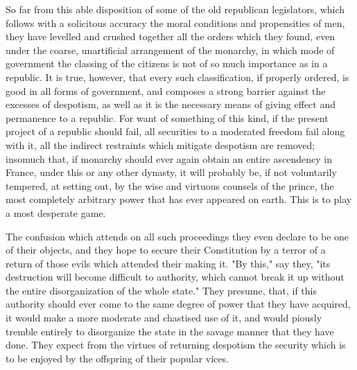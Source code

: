 So far from this able disposition of some of the old republican legislators, which follows with a solicitous accuracy the moral conditions and propensities of men, they have levelled and crushed together all the orders which they found, even under the coarse, unartificial arrangement of the monarchy, in which mode of government the classing of the citizens is not of so much importance as in a republic. It is true, however, that every such classification, if properly ordered, is good in all forms of government, and composes a strong barrier against the excesses of despotism, as well as it is the necessary means of giving effect and permanence to a republic. For want of something of this kind, if the present project of a republic should fail, all securities to a moderated freedom fail along with it, all the indirect restraints which mitigate despotism are removed; insomuch that, if monarchy should ever again obtain an entire ascendency in France, under this or any other dynasty, it will probably be, if not voluntarily tempered, at setting out, by the wise and virtuous counsels of the prince, the most completely arbitrary power that has ever appeared on earth. This is to play a most desperate game.

The confusion which attends on all such proceedings they even declare to be one of their objects, and they hope to secure their Constitution by a terror of a return of those evils which attended their making it. "By this," say they, "its destruction will become difficult to authority, which cannot break it up without the entire disorganization of the whole state." They presume, that, if this authority should ever come to the same degree of power that they have acquired, it would make a more moderate and chastised use of it, and would piously tremble entirely to disorganize the state in the savage manner that they have done. They expect from the virtues of returning despotism the security which is to be enjoyed by the offspring of their popular vices.

